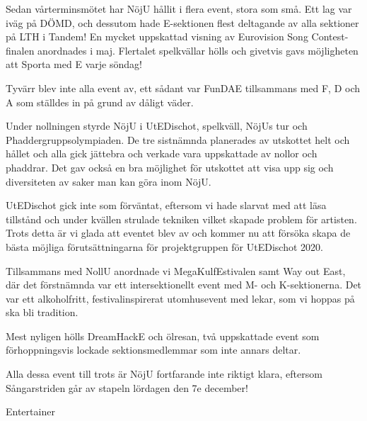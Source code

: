 \documentclass[../_main/handlingar.tex]{subfiles}
\begin{document}
\vspace{8px}

Sedan vårterminsmötet har NöjU hållit i flera event, stora som små. Ett lag var iväg på DÖMD, och dessutom hade E-sektionen flest deltagande av alla sektioner på LTH i Tandem! En mycket uppskattad visning av Eurovision Song Contest-finalen anordnades i maj. Flertalet spelkvällar hölls och givetvis gavs möjligheten att Sporta med E varje söndag! 

Tyvärr blev inte alla event av, ett sådant var FunDAE tillsammans med F, D och A som ställdes in på grund av dåligt väder. 

Under nollningen styrde NöjU i UtEDischot, spelkväll, NöjUs tur och Phaddergruppsolympiaden. De tre sistnämnda planerades av utskottet helt och hållet och alla gick jättebra och verkade vara uppskattade av nollor och phaddrar. Det gav också en bra möjlighet för utskottet att visa upp sig och diversiteten av saker man kan göra inom NöjU. 

UtEDischot gick inte som förväntat, eftersom vi hade slarvat med att läsa tillstånd och under kvällen strulade tekniken vilket skapade problem för artisten. Trots detta är vi glada att eventet blev av och kommer nu att försöka skapa de bästa möjliga förutsättningarna för  projektgruppen för UtEDischot 2020. 

Tillsammans med NollU anordnade vi MegaKulfEstivalen samt Way out East, där det förstnämnda var ett intersektionellt event med M- och K-sektionerna. Det var ett alkoholfritt, festivalinspirerat utomhusevent med lekar, som vi hoppas på ska bli tradition. 

Mest nyligen hölls DreamHackE och ölresan, två uppskattade event som förhoppningsvis lockade sektionsmedlemmar som inte annars deltar. 

Alla dessa event till trots är NöjU fortfarande inte riktigt klara, eftersom Sångarstriden går av stapeln lördagen den 7e december! 

\begin{signatures}{1}
    \mvh
    \signature{Saga Åslund}{Entertainer}
\end{signatures}
\end{document}
